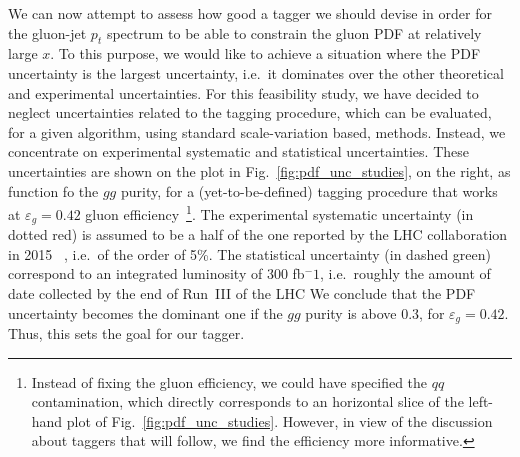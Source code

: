 We can now attempt to assess how good a tagger we should devise in order for the gluon-jet $p_t$ spectrum to be able to constrain the gluon PDF at relatively large $x$. To this purpose, we would like to achieve a situation where the PDF uncertainty is the largest uncertainty, i.e.\ it dominates over the other theoretical and experimental uncertainties. For this feasibility study, we have decided to neglect uncertainties related to the tagging procedure, which can be evaluated, for a given algorithm, using standard scale-variation based, methods. Instead, we concentrate on experimental systematic and statistical uncertainties. These uncertainties are shown on the plot in Fig.~\ref{fig:pdf_unc_studies}, on the right, as function fo the $gg$ purity, for a (yet-to-be-defined) tagging procedure that works at $\varepsilon_g=0.42$ gluon efficiency~\footnote{Instead of fixing the gluon efficiency, we could have specified the $qq$ contamination, which directly corresponds to an horizontal slice of the left-hand plot of Fig.~\ref{fig:pdf_unc_studies}. However, in view of the discussion about taggers that will follow, we find the efficiency more informative.}. 
%
The experimental systematic uncertainty (in dotted red)  is assumed to be a half of the one reported by the LHC collaboration in 2015~\cite{} , i.e.\ of the order of 5\%. The statistical uncertainty (in dashed green) correspond to an integrated luminosity of 300 fb$^-1$, i.e.\ roughly the amount of date collected by the end of Run~III of the LHC  
%
We conclude that the PDF uncertainty becomes the dominant one if the $gg$ purity is above 0.3, for $\varepsilon_g=0.42$. Thus, this sets the goal for our tagger.

